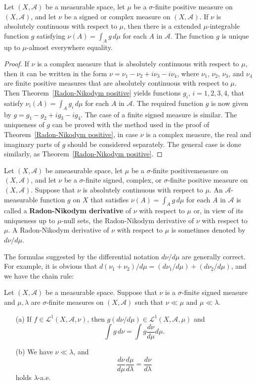 \begin{theorem}
Let $(X,\mathcal{A})$ be a measurable space, let $\mu$ be a $\sigma$-finite positive measure on $(X,\mathcal{A})$, and let $\nu$ be a signed or complex measure on $(X,\mathcal{A})$. If $\nu$ is absolutely continuous with respect to $\mu$, then there is a extended $\mu$-integrable function $g$ satisfying $\nu(A)=\int_Ag\,d\mu$ for each $A$ in $\mathcal{A}$. The function $g$ is unique up to $\mu$-almost everywhere equality.
\end{theorem}
\begin{proof}
If $\nu$ is a complex measure that is absolutely continuous with respect to $\mu$, then it can be written in the form $\nu=\nu_1-\nu_2+i\nu_3-i\nu_4$, where $\nu_1$, $\nu_2$, $\nu_3$, and $\nu_4$ are finite positive measures that are absolutely continuous with respect to $\mu$. Then Theorem~\ref{Radon-Nikodym positive} yields functions $g_i$, $i=1,2,3,4$, that satisfy $\nu_i(A)=\int_Ag_i\,d\mu$ for each $A$ in $\mathcal{A}$. The required function $g$ is now given by $g=g_1-g_2+ig_3-ig_4$. The case of a finite signed measure is similar. The uniqueness of $g$ can be proved with the method used in the proof of Theorem~\ref{Radon-Nikodym positive}, in case $\nu$ is a complex measure, the real and imaginary parts of $g$ should be considered separately. The general case is done similarly, as Theorem~\ref{Radon-Nikodym positive}.
\end{proof}
Let $(X,\mathcal{A})$ be ameasurable space, let $\mu$ be a $\sigma$-finite positivemeasure on $(X,\mathcal{A})$, and let $\nu$ be a $\sigma$-finite signed, complex, or $\sigma$-finite positive measure on $(X,\mathcal{A})$. Suppose that $\nu$ is absolutely continuous with respect to $\mu$. An $\mathcal{A}$-measurable function $g$ on $X$ that satisfies $\nu(A)=\int_Ag\,d\mu$ for each $A$ in $\mathcal{A}$ is called a \textbf{Radon-Nikodym derivative} of $\nu$ with respect to $\mu$ or, in view of its uniqueness up to $\mu$-null sets, the Radon-Nikodym derivative of $\nu$ with respect to $\mu$. A Radon-Nikodym derivative of $\nu$ with respect to $\mu$ is sometimes denoted by $d\nu/d\mu$.\par
The formulas suggested by the differential notation $d\nu/d\mu$ are generally correct. For example, it is obvious that $d(\nu_1+\nu_2)/d\mu=(d\nu_1/d\mu)+(d\nu_2/d\mu)$, and we have the chain rule:
\begin{proposition}\label{Radon-Nikodym derivative prop}
Let $(X,\mathcal{A})$ be a measurable space. Suppose that $\nu$ is a $\sigma$-finite signed measure and $\mu,\lambda$ are $\sigma$-finite measures on $(X,\mathcal{A})$ such that $\nu\ll\mu$ and $\mu\ll\lambda$.
\begin{itemize}
\item[(a)] If $f\in\mathcal{L}^1(X,\mathcal{A},\nu)$, then $g(d\nu/d\mu)\in\mathcal{L}^1(X,\mathcal{A},\mu)$ and
\[\int g\,d\nu=\int g\frac{d\nu}{d\mu}d\mu.\] 
\item[(b)] We have $\nu\ll\lambda$, and
\[\frac{d\nu}{d\mu}\frac{d\mu}{d\lambda}=\frac{d\nu}{d\lambda}\]
holds $\lambda$-a.e. 
\end{itemize}
\end{proposition}
